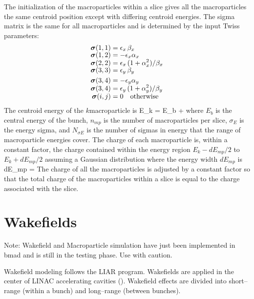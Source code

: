 The initialization of the macroparticles within a slice gives all the
macroparticles the same centroid position except with differing
centroid energies. 
The sigma matrix is the same for all macroparticles and is
determined by the input Twiss parameters:
\begin{align}
  \bfsigma(1,1) &= \epsilon_x \, \beta_x \CRNEG
  \bfsigma(1,2) &= -\epsilon_x \alpha_x  \CRNEG
  \bfsigma(2,2) &= \epsilon_x \, (1 + \alpha_x^2) / \beta_x \CRNEG
  \bfsigma(3,3) &= \epsilon_y \, \beta_y \\
  \bfsigma(3,4) &= -\epsilon_y \alpha_y \CRNEG
  \bfsigma(3,4) &= \epsilon_y \, (1 + \alpha_y^2) / \beta_y \CRNEG
  \bfsigma(i,j) &= 0 \quad \mbox{otherwise} \nonumber
\end{align}
The centroid energy of the $k$\Th macroparticle is
\Begineq
  E_k = E_b + 
\Endeq
where $E_b$ is the central energy of the bunch, $n_{mp}$ is the number
of macroparticles per slice, $\sigma_E$ is the energy sigma, and
$N_{\sigma E}$ is the number of sigmas in energy that the range of
macroparticle energies cover. The charge of each macroparticle is,
within a constant factor, the charge contained within the energy
region $E_k - dE_{mp}/2$ to $E_k + dE_{mp}/2$ assuming a Gaussian
distribution where the energy width $dE_{mp}$ is
\Begineq
  dE_{mp} = 
\Endeq
The charge of all the macroparticles is adjusted by a constant factor
so that the total charge of the macroparticles within a slice is equal
to the charge associated with the slice.



\section{Wakefields}
\label{s:wakefields}

Note: Wakefield and Macroparticle simulation have just been implemented
in bmad and is still in the testing phase. Use with caution.

Wakefield modeling follows the LIAR program\cite{b:liar}. Wakefields
are applied in the center of LINAC accelerating cavities
(). Wakefield effects are divided into short--range
(within a bunch) and long--range (between bunches).

